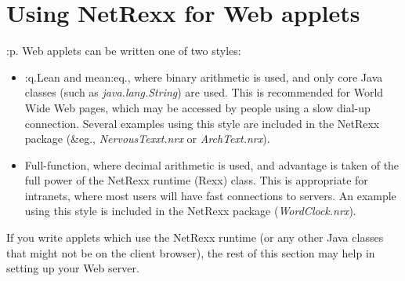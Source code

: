 \chapter{Using NetRexx for Web applets}
:p.
Web applets can be written one of two styles:
\begin{itemize}
\item :q.Lean and mean:eq., where binary arithmetic is used, and only core
Java classes (such as \emph{java.lang.String}) are used.  This is
recommended for World Wide Web pages, which may be accessed by people
using a slow dial-up connection.
Several examples using this style are included in the NetRexx package
(&eg., \emph{NervousTexxt.nrx} or \emph{ArchText.nrx}).
\item Full-function, where decimal arithmetic is used, and advantage is
taken of the full power of the NetRexx runtime (Rexx) class.
This is appropriate for intranets, where most users will have fast
connections to servers.
An example using this style is included in the NetRexx package
(\emph{WordClock.nrx}).
\end{itemize}
If you write applets which use the NetRexx runtime (or any other Java
classes that might not be on the client browser), the rest of this
section may help in setting up your Web server.

